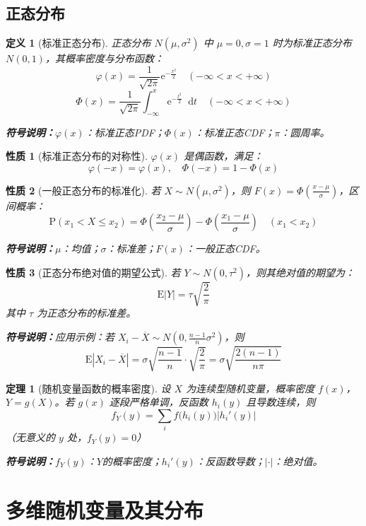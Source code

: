 \documentclass[11pt,a4paper,oneside]{article}
\theoremstyle{yhbthm}
\newtheorem{theorem}{定理}[section]
\newtheorem{definition}{定义}[section]
\newtheorem{property}{性质}[section]
\newcommand{\E}{\mathrm{E}}
\newcommand{\Prob}{\mathrm{P}}
\newcommand{\dif}{\mathop{}\!\mathrm{d}}
\newcommand{\e}{\mathrm{e}}
\newcommand{\symnote}[1]{\par\noindent\textbf{符号说明：}#1\par}
\begin{document}
\subsection{正态分布}
\begin{definition}[标准正态分布]
正态分布 $N(\mu,\sigma^2)$ 中 $\mu=0, \sigma=1$ 时为标准正态分布 $N(0,1)$，其概率密度与分布函数：
$$
\varphi(x)=\frac{1}{\sqrt{2\pi}} \e^{-\frac{x^2}{2}} \quad (-\infty < x < +\infty)
$$
$$
\Phi(x)=\frac{1}{\sqrt{2\pi}} \int_{-\infty}^{x} \e^{-\frac{t^2}{2}} \dif t \quad (-\infty < x < +\infty)
$$
\symnote{$\varphi(x)$：标准正态PDF；$\Phi(x)$：标准正态CDF；$\pi$：圆周率。}
\end{definition}

\begin{property}[标准正态分布的对称性]
$\varphi(x)$ 是偶函数，满足：
$$
\varphi(-x)=\varphi(x), \quad \Phi(-x)=1-\Phi(x)
$$
\end{property}

\begin{property}[一般正态分布的标准化]
若 $X \sim N(\mu,\sigma^2)$，则 $F(x)=\Phi\left( \frac{x-\mu}{\sigma} \right)$，区间概率：
$$
\Prob(x_1 < X \leq x_2)=\Phi\left( \frac{x_2-\mu}{\sigma} \right)-\Phi\left( \frac{x_1-\mu}{\sigma} \right) \quad (x_1 < x_2)
$$
\symnote{$\mu$：均值；$\sigma$：标准差；$F(x)$：一般正态CDF。}
\end{property}

\begin{property}[正态分布绝对值的期望公式]
若 $Y \sim N(0, \tau^2)$，则其绝对值的期望为：
$$
\E|Y| = \tau \sqrt{\frac{2}{\pi}}
$$
其中 $\tau$ 为正态分布的标准差。

\symnote{应用示例：若 $X_i - \overline{X} \sim N\left(0, \frac{n-1}{n}\sigma^2\right)$，则
$$
\E|X_i - \overline{X}| = \sigma\sqrt{\frac{n-1}{n}} \cdot \sqrt{\frac{2}{\pi}} = \sigma\sqrt{\frac{2(n-1)}{n\pi}}
$$
}
\end{property}

\begin{theorem}[随机变量函数的概率密度]
设 $X$ 为连续型随机变量，概率密度 $f(x)$，$Y = g(X)$。若 $g(x)$ 逐段严格单调，反函数 $h_i(y)$ 且导数连续，则
$$
f_Y(y) = \sum_{i} f\bigl(h_i(y)\bigr)\left|h_i'(y)\right|
$$
（无意义的 $y$ 处，$f_Y(y)=0$）
\symnote{$f_Y(y)$：$Y$的概率密度；$h_i'(y)$：反函数导数；$|\cdot|$：绝对值。}
\end{theorem}

\section{多维随机变量及其分布}
\end{document}
